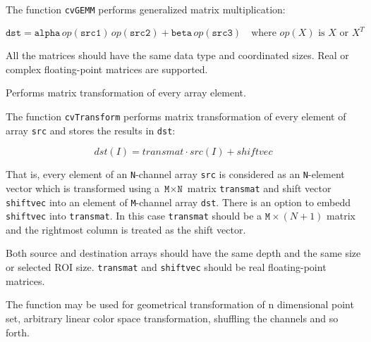 The function \texttt{cvGEMM} performs generalized matrix multiplication:

\[
\texttt{dst} = \texttt{alpha} \, op(\texttt{src1}) \, op(\texttt{src2}) + \texttt{beta} \, op(\texttt{src3}) \quad \text{where $op(X)$ is $X$ or $X^T$}
\]

All the matrices should have the same data type and coordinated sizes. Real or complex floating-point matrices are supported.

\label{Transform}

Performs matrix transformation of every array element.


\begin{description}
\end{description}

The function \texttt{cvTransform} performs matrix transformation of every element of array \texttt{src} and stores the results in \texttt{dst}:

\[
dst(I) = transmat \cdot src(I) + shiftvec %
\]

That is, every element of an \texttt{N}-channel array \texttt{src} is
considered as an \texttt{N}-element vector which is transformed using
a $\texttt{M} \times \texttt{N}$ matrix \texttt{transmat} and shift
vector \texttt{shiftvec} into an element of \texttt{M}-channel array
\texttt{dst}. There is an option to embedd \texttt{shiftvec} into
\texttt{transmat}. In this case \texttt{transmat} should be a $\texttt{M}
\times (N+1)$ matrix and the rightmost column is treated as the shift
vector.

Both source and destination arrays should have the same depth and the
same size or selected ROI size. \texttt{transmat} and \texttt{shiftvec}
should be real floating-point matrices.

The function may be used for geometrical transformation of n dimensional
point set, arbitrary linear color space transformation, shuffling the
channels and so forth.

\label{PerspectiveTransform}

